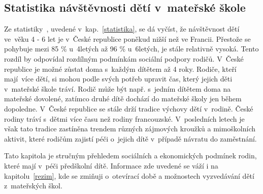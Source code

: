 			\subsection{Statistika návštěvnosti dětí v mateřské škole}
		
				Ze statistiky~\cite{Eurydice}, uvedené v kap.~\ref{statistika}, se dá vyčíst, že návštěvnost dětí ve věku 4 - 6 let je v~České republice poněkud nižší než ve Francii. Přestože se pohybuje mezi 85 \% u~4letých až 96 \% u~6letých, je stále relativně vysoká. Tento rozdíl by odpovídal rozdílným podmínkám sociální podpory rodičů. V České republice je možné zůstat doma s každým dítětem až 4 roky. Rodiče, kteří mají více dětí, si mohou podle svých potřeb upravit čas, který jejich děti v mateřské škole tráví. Rodič může být např. s~jedním dítětem doma na mateřské dovolené, zatímco druhé dítě dochází do mateřské školy jen během dopoledne. V České republice se stále drží tradice výchovy dětí v rodině. České rodiny tráví s~dětmi více času než rodiny francouzské. V posledních letech je však tato tradice zastíněna trendem různých zájmových kroužků a mimoškolních aktivit, které rodičům zajistí péči o~jejich dítě v~případě návratu do zaměstnání.  


				
	Tato kapitola je stručným přehledem sociálních a ekonomických podmínek rodin, které mají v péči předškolní dítě. Informace zde uvedené se váží i na kapitolu~\ref{rezim}, kde se zmiňuji o~otevírací době a možnostech vyzvedávání dětí z~mateřských škol.

